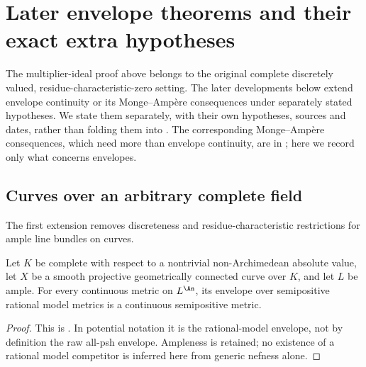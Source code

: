\section{Later envelope theorems and their exact extra hypotheses}
\label{sec:ch23-later}

The multiplier-ideal proof above belongs to the original complete discretely
valued, residue-characteristic-zero setting.  The later developments below extend envelope continuity or its
Monge--Amp\`ere consequences under separately stated hypotheses.
We state them separately, with their own hypotheses, sources and dates,
rather than folding them into
.  The corresponding
Monge--Amp\`ere consequences, which need more than envelope continuity, are
in ; here we record only what concerns envelopes.

\subsection{Curves over an arbitrary complete field}
\label{sec:ch23-later-curves}

The first extension removes discreteness and residue-characteristic
restrictions for ample line bundles on curves.

\begin{theorem}
\label{thm:ch23-gjkm-curves}
Let $K$ be complete with respect to a nontrivial non-Archimedean
absolute value, let $X$ be a smooth projective geometrically connected
curve over $K$, and let $L$ be ample.  For every continuous metric
on $L^{\An}$, its envelope over semipositive rational model metrics
is a continuous semipositive metric.
\end{theorem}

\begin{proof}
This is \cite[Theorem~1.1]{GJKM19}.  In potential notation it is the
rational-model envelope, not by definition the raw all-psh envelope.
Ampleness is retained; no existence of a rational model competitor is
inferred here from generic nefness alone.
\end{proof}

